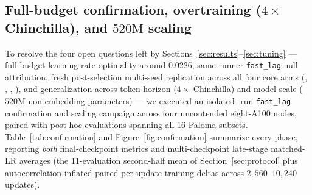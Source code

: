 \subsection{Full-budget confirmation, overtraining (\texorpdfstring{$4\times$}{4x} Chinchilla), and \texorpdfstring{$520\text{M}$}{520M} scaling}
\label{sec:confirmation}

To resolve the four open questions left by Sections~\ref{sec:results}--\ref{sec:tuning}
--- full-budget learning-rate optimality around $0.0226$, same-runner
\texttt{fast\_lag} null attribution, fresh post-selection multi-seed replication
across all four core arms (, , ,
), and generalization across token horizon ($4\times$
Chinchilla) and model scale ($520\text{M}$ non-embedding parameters) --- we
executed an isolated \confTotalRuns{}-run \texttt{fast\_lag} confirmation and
scaling campaign across four uncontended eight-A100 nodes, paired with
\confPalomaCount{} post-hoc evaluations spanning all 16 Paloma subsets.
Table~\ref{tab:confirmation} and Figure~\ref{fig:confirmation} summarize every
phase, reporting \emph{both} final-checkpoint metrics and multi-checkpoint
late-stage matched-LR averages (the 11-evaluation second-half mean of
Section~\ref{sec:protocol} plus autocorrelation-inflated paired per-update
training deltas across $2{,}560$--$10{,}240$ updates).

\begin{table}[t]
\centering
\caption{Master summary of the \confTotalRuns{}-run \texttt{fast\_lag}
confirmation and scaling campaign (negative deltas are better; all deltas are
paired within regime against the listed  reference row, which
reports absolute losses). \textbf{Late-11 $\Delta$Sel} averages all 11
second-half held-out evaluations ($\text{step} > T/2$, covering $\approx 8.65\text{M}$
held-out selection tokens) with per-checkpoint win counts; \textbf{2nd-Half
$\Delta$Train$\pm$SE} is the lag-1 autocorrelation-inflated paired per-update
training difference over the entire second half ($2{,}560$, $10{,}240$, or
$5{,}120$ consecutive updates). \textbf{16-Dom Paloma $\Delta$} reports the
macro mean across all 16 Paloma domains with domain (or seed) win counts.
\textbf{Step\% / GiB} uses full-run post-warmup median step times across all
$5{,}120$--$20{,}480$ updates. In Phase~2, Gate~1 locked  to
$\eta=0.016$ while keeping / at $\eta=0.0226$;
mid-decay averages are omitted there because the $41\%$ hotter LR induces
higher transient mid-decay loss before converging lower at step $5{,}120$.}
\label{tab:confirmation}
\scriptsize\setlength{\tabcolsep}{3.1pt}
\resizebox{\textwidth}{!}{}
\end{table}

